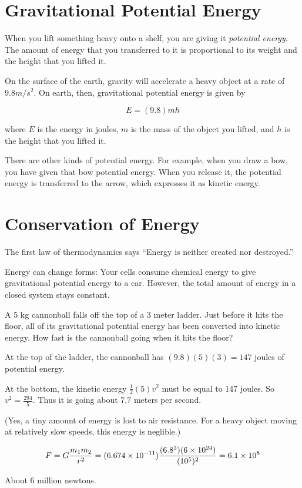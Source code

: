 \section{Gravitational Potential Energy}

When you lift something heavy onto a shelf, you are giving it
\textit{potential energy}. The amount of energy that you transferred
to it is proportional to its weight and the height that you lifted it.

On the surface of the earth, gravity will accelerate a heavy object at
a rate of $9.8 m/s^2$. On earth, then, gravitational potential energy is given by

$$E = (9.8)mh$$

where $E$ is the energy in joules, $m$ is the mass of the object you
lifted, and $h$ is the height that you lifted it.

There are other kinds of potential energy. For example, when you draw
a bow, you have given that bow potential energy. When you release it,
the potential energy is transferred to the arrow, which expresses it
as kinetic energy.

\section{Conservation of Energy}

The first law of thermodynamics says ``Energy is neither created nor
destroyed.''

Energy can change forms: Your cells consume chemical energy to give
gravitational potential energy to a car.  However, the total amount of
energy in a closed system stays constant.

\begin{Exercise}[title={The Energy of Falling}, label=energy_falling]
  
A 5 kg cannonball falls off the top of a 3 meter ladder. Just before
it hits the floor, all of its gravitational potential energy has been
converted into kinetic energy.  How fast is the cannonball going when
it hits the floor?

\end{Exercise}
\begin{Answer}[ref=energy_falling]

  At the top of the ladder, the cannonball has $(9.8)(5)(3) = 147$ joules of potential energy.

  At the bottom, the kinetic energy $\frac{1}{2}(5)v^2$ must be equal
  to 147 joules. So $v^2 = \frac{294}{5}$.  Thus it is going about
  $7.7$ meters per second.

  (Yes, a tiny amount of energy is lost to air resistance. For a heavy
  object moving at relatively slow speeds, this energy is neglible.)

  
  $$F = G\frac{m_1 m_2}{r^2} = (6.674 \times 10^{-11})\frac{(6.8 \time 10^3)(6 \times 10^{24})}{(10^5)^2} = 6.1 \times 10^{6}$$

  About 6 million newtons.
  
\end{Answer}


